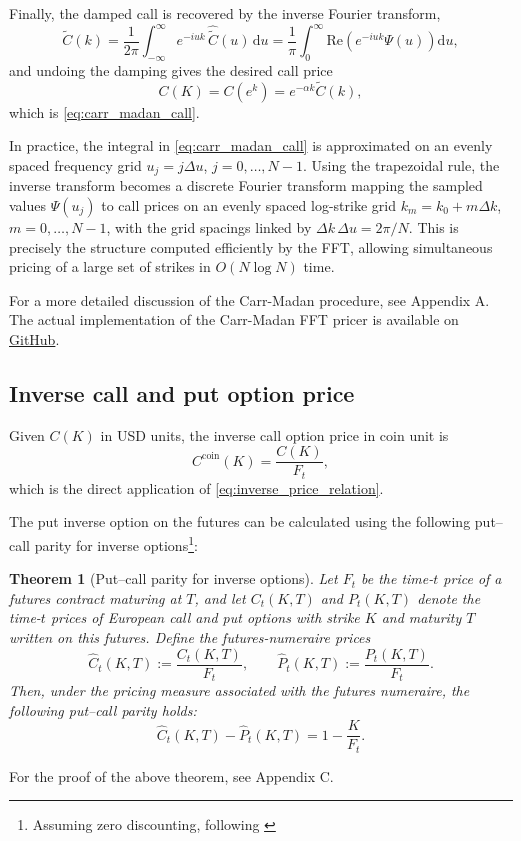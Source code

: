 \documentclass[a4paper,titlepage,12pt]{report}
\theoremstyle{plain}
\newtheorem*{theorem*}{Theorem}
\begin{document}
Finally, the damped call is recovered by the inverse Fourier transform,
\begin{equation}
\widetilde C(k)
=
\frac{1}{2\pi}\int_{-\infty}^{\infty} e^{-iuk}\,\widehat{\widetilde C}(u)\,\mathrm{d}u
=
\frac{1}{\pi}\int_{0}^{\infty}\mathrm{Re}\!\left(e^{-iuk}\Psi(u)\right)\mathrm{d}u,
\label{eq:IFT_damped_call}
\end{equation}
and undoing the damping gives the desired call price
\[
C(K)=C(e^k)=e^{-\alpha k}\widetilde C(k),
\]
which is \eqref{eq:carr_madan_call}.

In practice, the integral in \eqref{eq:carr_madan_call} is approximated on an evenly spaced frequency
grid $u_j=j\Delta u$, $j=0,\dots,N-1$. Using the trapezoidal rule, the inverse transform becomes a
discrete Fourier transform mapping the sampled values $\Psi(u_j)$ to call prices on an evenly spaced
log-strike grid $k_m = k_0 + m\Delta k$, $m=0,\dots,N-1$, with the grid spacings linked by
$\Delta k\,\Delta u = 2\pi/N$. This is precisely the structure computed efficiently by the FFT,
allowing simultaneous pricing of a large set of strikes in $O(N\log N)$ time.

For a more detailed discussion of the Carr-Madan procedure, see Appendix A. The actual implementation of the Carr-Madan FFT pricer is available on \href{https://github.com/znmahbub/SVCJ-Deribit-Inverse-Options-Pricer/blob/main/src/inverse_fft_pricer.py}{GitHub}.

\subsection{Inverse call and put option price}
\label{subsec:inverse_price}

Given $C(K)$ in USD units, the inverse call option price in coin unit is
\begin{equation}
C^{\mathrm{coin}}(K) = \frac{C(K)}{F_t},
\label{eq:inverse_call_put_prices}
\end{equation}
which is the direct application of \eqref{eq:inverse_price_relation}.

The put inverse option on the futures can be calculated using the following put--call parity for inverse options\footnote{Assuming zero discounting, following \citep{LucicSepp2024}}:

\begin{theorem*}[Put--call parity for inverse options]
Let $F_t$ be the time-$t$ price of a futures contract maturing at $T$, and let $C_t(K,T)$ and
$P_t(K,T)$ denote the time-$t$ prices of European call and put options with strike $K$ and maturity
$T$ written on this futures. Define the \emph{futures-numeraire prices}
\[
\widehat C_t(K,T):=\frac{C_t(K,T)}{F_t},
\qquad
\widehat P_t(K,T):=\frac{P_t(K,T)}{F_t}.
\]
Then, under the pricing measure associated with the futures numeraire, the following put--call parity holds:
\begin{equation}
\boxed{
\widehat C_t(K,T)-\widehat P_t(K,T)=1-\frac{K}{F_t}.}
\label{eq:pcp_futures_numeraire}
\end{equation}
\end{theorem*}
For the proof of the above theorem, see Appendix C.
\end{document}
